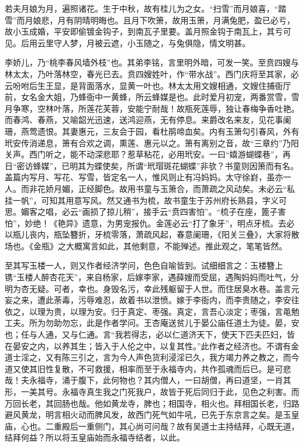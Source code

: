 {若夫月娘为月，遍照诸花。生于中秋，故有桂儿为之女。“扫雪”而月娘喜，“踏雪”而月娘悲，月有阴晴明晦也。且月下吹箫，故用玉箫，月满兔肥，盈已必亏，故小玉成婚，平安即偷镀金钩子，到南瓦子里要。盖月照金钩于南瓦上，其亏可见。后用云里守人梦，月被云遮，小玉随之，与兔俱隐，情文明甚。

李娇儿，乃“桃李春风墙外枝”也。其弟李铭，言里明外暗，可发一笑。至贲四嫂与林太太，乃叶落林空，春光已去。贲四嫂姓叶，作“带水战”。西门庆将至其家，必云吩咐后生王显，是背面落水，显黄一叶也。林太太用文嫂相通，文嫂住捕衙厅前，女名金大姐，乃蜂衙中一黄蜂，所云蜂媒是也。此时爱月初宠，两番赏雪，雪月争寒，空林叶落，所莲花芙蓉，安能宁耐哉！故瓶死莲辱，独让春梅争香吐艳。而春鸿、春燕，又喻韶光迅速，送鸿迎燕，无有停息。来爵改名来友，见花事阑珊，燕莺遗恨。其妻惠元，三友会于园，看杜鹃啼血矣。内有玉箫勾引春风，外有玳安传消递息，箫有合欢之调，熏莲、惠元以之。箫有离别之音，故“三章约”乃阳关声。西门听之，能不动深悲耶？惹草粘花，必用玳安。一曰“嬉游蝴蝶巷”，再日“密访蜂媒”，已明其为蝶使矣，所谓“玳瑁斑花蝴蝶”非欤？书童则因箫而有名。盖篇内写月、写花、写雪，皆定名一人，惟风则止有冯妈妈。太守徐崶，虽亦一人。而非花娇月媚，正经脚色。故用书童与玉箫合，而萧疏之风动矣。未必云“私挂一帆”，可知其用意写风。然又通书为梳，故书童生于苏州府长熟县，字义可思。媚客之唱，必云“画损了掠儿稍”，接手云“贲四害怕”。“梳子在座，篦子害怕”，妙绝！《艳异》遗意，为男宠报仇。金莲必云“打了象牙”，明点牙梳。去必以瓶儿丧内，瓶坠簪折，牙梳零落，萧疏风起，春意阑珊，《阳关三叠》，大家将散场也。《金瓶》之大概寓言如此，其他剩意，不能殚述。推此观之，笔笔皆然。

至其写玉楼一人，则又作者经济学问，色色自喻皆到。试细细言之：玉楼簪上镌“玉楼人醉杏花天”，来自杨家，后嫁李家，遇薛嫂而受屈，遇陶妈妈而吐气，分明为杏无疑。可者，幸也。身毁名污，幸此残躯留于人世。而住居臭水巷。盖言元妄之来，遭此荼毒，污辱难忍，故着书以泄愤。嫁于李衙内，而李贵随之，李安往依之，以理为贵，以理为安。归于真定、枣强。真定，言吾心淡定；枣强，言黾勉工夫。所为勿助勿忘，此是作者学问。王杏庵送贫儿于晏公庙任道土为徒。晏，安也；任与人通，又与仁通。言“我若得志，必以仁道济天下，使天下匹夫匹妇，皆在晏安之内，以养其生；皆入于人伦之中，以复其性。”此作者之经济也。不谓有金道士淫之，又有陈三引之，言为今人声色货利浸淫已久，我方竭力养之教之，而今道又使其旧性复散，不可救援，相率而至于永福寺内，共作孤魂而后已。是可悲哉！夫永福寺，涌于腹下，此何物也？其内僧人，一曰胡僧，再曰道坚，一肖其形，一美其号。永福寺真生我之门死我户，故皆于死后同归于此，见色之利害。而万回长老，其回肠也哉。他如黄龙寺，脾也；相国寺，相火也。拜相国长老，归路避风黄龙，明言相火动而脾风发，故西门死气如牛吼，已先于东京言之矣。是玉皇庙，心也。二重殿后一重侧门，其心尚可问哉？故有吴道士主持结拜，心既无道，结拜何益？所以将玉皇庙始而永福寺结者，以此。

}
